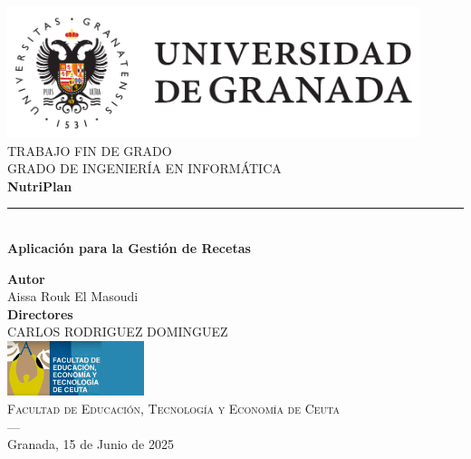 \documentclass[twoside, openright, 11pt]{report}
\begin{document}
\begin{titlepage}


\newlength{\centeroffset}
\setlength{\centeroffset}{-0.5\oddsidemargin}
\addtolength{\centeroffset}{0.5\evensidemargin}
\thispagestyle{empty}

\noindent\hspace*{\centeroffset}\begin{minipage}{\textwidth}

\centering
\includegraphics[width=0.9\textwidth]{imagenes/logo_ugr}\\[1.4cm]

\textsc{ \Large TRABAJO FIN DE GRADO\\[0.2cm]}
\textsc{ GRADO DE INGENIERÍA EN INFORMÁTICA}\\[1cm]
%
{\huge\bfseries NutriPlan\\
}
\noindent\rule[-1ex]{\textwidth}{3pt}\\[3.5ex]
{\large\bfseries Aplicación para la Gestión de Recetas}
\end{minipage}

\vspace{0.5cm}
\noindent\hspace*{\centeroffset}\begin{minipage}{\textwidth}
\centering

\textbf{Autor}\\ {Aissa Rouk El Masoudi}\\[2.5ex]
\textbf{Directores}\\
{CARLOS RODRIGUEZ DOMINGUEZ}\\[2cm]
\includegraphics[width=0.3\textwidth]{imagenes/logo-ceuta.jpg}\\[0.1cm]
\textsc{Facultad de Educación, Tecnología y Economía de Ceuta}\\
\textsc{---}\\
Granada, 15 de Junio de 2025
\end{minipage}
\end{titlepage}
\let\cleardoublepage\clearpage
\end{document}

